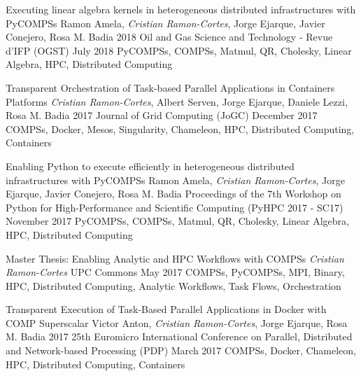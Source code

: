 \begin{publications}
    \publication
        {Executing linear algebra kernels in heterogeneous distributed infrastructures with PyCOMPSs}
        {Ramon Amela, \textit{Cristian Ramon-Cortes}, Jorge Ejarque, Javier Conejero, Rosa M. Badia}
        {2018 Oil and Gas Science and Technology - Revue d’IFP (OGST)}
        {July 2018}
        {PyCOMPSs, COMPSs, Matmul, QR, Cholesky, Linear Algebra, HPC, Distributed Computing}
        {}

    \publication
        {Transparent Orchestration of Task-based Parallel Applications in Containers Platforms}
        {\textit{Cristian Ramon-Cortes}, Albert Serven, Jorge Ejarque, Daniele Lezzi, Rosa M. Badia}
        {2017 Journal of Grid Computing (JoGC)}
        {December 2017}
        {COMPSs, Docker, Mesos, Singularity, Chameleon, HPC, Distributed Computing, Containers}
        {}

    \publication
        {Enabling Python to execute efficiently in heterogeneous distributed infrastructures with PyCOMPSs}
        {Ramon Amela, \textit{Cristian Ramon-Cortes}, Jorge Ejarque, Javier Conejero, Rosa M. Badia}
        {Proceedings of the 7th Workshop on Python for High-Performance and Scientific Computing (PyHPC 2017 - SC17)}
        {November 2017}
        {PyCOMPSs, COMPSs, Matmul, QR, Cholesky, Linear Algebra, HPC, Distributed Computing}
        {}
        
    \publication
        {Master Thesis: Enabling Analytic and HPC Workflows with COMPSs}
        {\textit{Cristian Ramon-Cortes}}
        {UPC Commons}
        {May 2017}
        {COMPSs, PyCOMPSs, MPI, Binary, HPC, Distributed Computing, Analytic Workflows, Task Flows, Orchestration}
        {}

    \publication
        {Transparent Execution of Task-Based Parallel Applications in Docker with COMP Superscalar}
        {Victor Anton, \textit{Cristian Ramon-Cortes}, Jorge Ejarque, Rosa M. Badia}
        {2017 25th Euromicro International Conference on Parallel, Distributed and Network-based Processing (PDP)}
        {March 2017}
        {COMPSs, Docker, Chameleon, HPC, Distributed Computing, Containers}
        {}


\end{publications}
